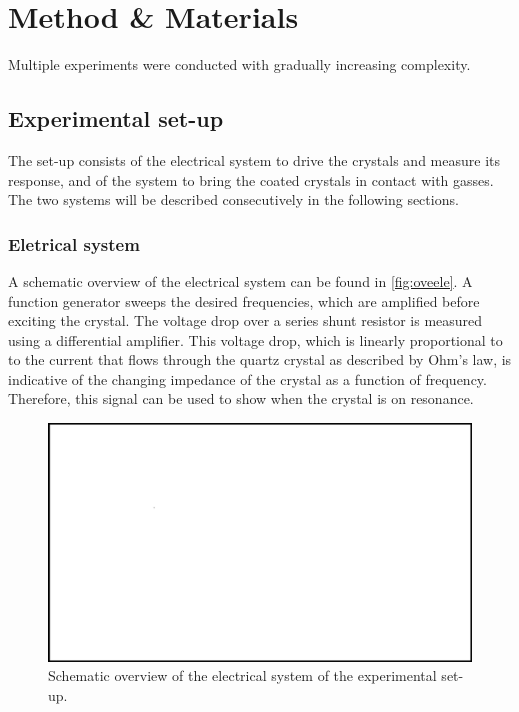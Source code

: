 \section{Method \& Materials}
Multiple experiments were conducted with gradually increasing complexity. 

\subsection{Experimental set-up}
The set-up consists of the electrical system to drive the crystals and measure its response, and of the system to bring the coated crystals in contact with gasses. The two systems will be described consecutively in the following sections.

\subsubsection{Eletrical system}
A schematic overview of the electrical system can be found in \autoref{fig:oveele}. A function generator sweeps the desired frequencies, which are amplified before exciting the crystal. The voltage drop over a series shunt resistor is measured using a differential amplifier. This voltage drop, which is linearly proportional to to the current that flows through the quartz crystal as described by Ohm's law, is indicative of the changing impedance of the crystal as a function of frequency. Therefore, this signal can be used to show when the crystal is on resonance. 
\begin{figure}
	\centering
		\includegraphics[width=\textwidth]{figures/placeholder.png}
	\caption{Schematic overview of the electrical system of the experimental set-up. }
	\label{fig:oveele}
\end{figure}

